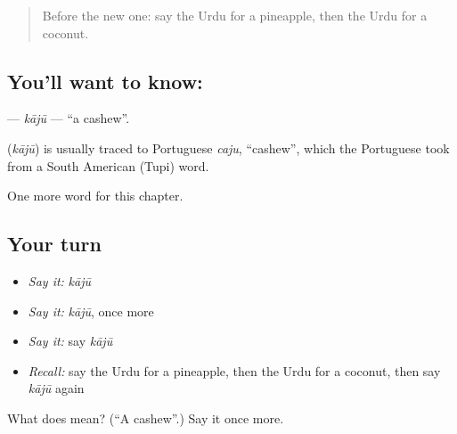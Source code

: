 \label{lesson:UR-C252-kaju}



\begin{quote}
Before the new one: say the Urdu for a pineapple, then the Urdu for a coconut.
\end{quote}

\subsection*{You'll want to know: }
\textbf{} — \emph{kājū} — \textquotedblleft{}a cashew\textquotedblright{}.

\begin{cousinweb}
\textbf{} (\emph{kājū}) is usually traced to Portuguese \emph{caju}, \textquotedblleft{}cashew\textquotedblright{}, which the Portuguese took from a South American (Tupi) word.
\end{cousinweb}

\begin{grammarlens}[title={What you've built}]
One more word for this chapter.
\end{grammarlens}

\subsection*{Your turn}
\begin{itemize}
\raggedright
  \item \emph{Say it:} \emph{kājū}
  \item \emph{Say it:} \emph{kājū}, once more
  \item \emph{Say it:} say \emph{kājū}
  \item \emph{Recall:} say the Urdu for a pineapple, then the Urdu for a coconut, then say \emph{kājū} again
\end{itemize}

\begin{tcolorbox}[breakable,colback=teal!4,colframe=teal!35!black,title={Before you move on}]
What does  mean? (\textquotedblleft{}A cashew\textquotedblright{}.) Say it once more.
\end{tcolorbox}
